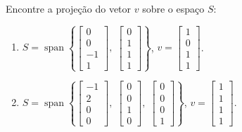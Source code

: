 \begin{question}
  Encontre a projeção do vetor $v$ sobre o espaço $S$:
  \begin{enumerate}[label=\alph*)]
    \item $S = \operatorname{span}\left\{
            \begin{bmatrix}
              0 \\ 0 \\ -1 \\ 1
            \end{bmatrix}, \;
            \begin{bmatrix}
              0 \\ 1 \\ 1 \\ 1
            \end{bmatrix}
            \right\}$, $v = \begin{bmatrix}
              1 \\ 0 \\ 1 \\ 1
            \end{bmatrix}$.

    \item $S = \operatorname{span}\left\{
            \begin{bmatrix}
              -1 \\ 2 \\ 0 \\ 0
            \end{bmatrix}, \;
            \begin{bmatrix}
              0 \\ 0 \\ 1 \\ 0
            \end{bmatrix}, \;
            \begin{bmatrix}
              0 \\ 0 \\ 0 \\ 1
            \end{bmatrix}
            \right\}$, $v = \begin{bmatrix}
              1 \\ 1 \\ 1 \\ 1
            \end{bmatrix}$.
  \end{enumerate}
\end{question}

